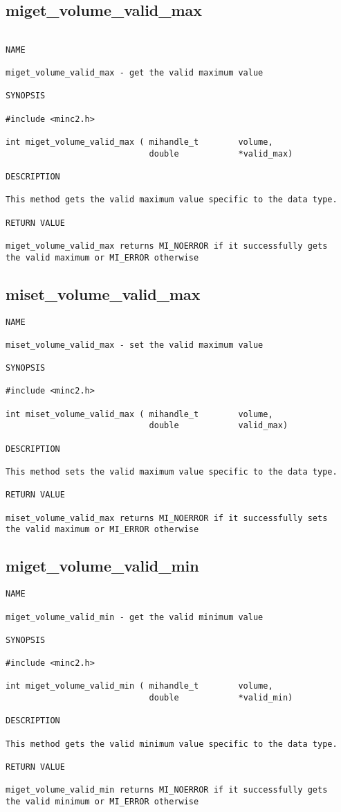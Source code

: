 \documentclass{article}
\begin{document}
\subsection{miget\_volume\_valid\_max}
\begin{verbatim}

NAME 

miget_volume_valid_max - get the valid maximum value 

SYNOPSIS

#include <minc2.h>

int miget_volume_valid_max ( mihandle_t        volume,
                             double            *valid_max)
                                
DESCRIPTION

This method gets the valid maximum value specific to the data type.

RETURN VALUE

miget_volume_valid_max returns MI_NOERROR if it successfully gets 
the valid maximum or MI_ERROR otherwise
\end{verbatim}

\subsection{miset\_volume\_valid\_max}
\begin{verbatim}
NAME 

miset_volume_valid_max - set the valid maximum value 

SYNOPSIS

#include <minc2.h>

int miset_volume_valid_max ( mihandle_t        volume,
                             double            valid_max)
                                
DESCRIPTION

This method sets the valid maximum value specific to the data type.

RETURN VALUE

miset_volume_valid_max returns MI_NOERROR if it successfully sets 
the valid maximum or MI_ERROR otherwise
\end{verbatim}

\subsection{miget\_volume\_valid\_min}
\begin{verbatim}
NAME 

miget_volume_valid_min - get the valid minimum value 

SYNOPSIS

#include <minc2.h>

int miget_volume_valid_min ( mihandle_t        volume,
                             double            *valid_min)
                                
DESCRIPTION

This method gets the valid minimum value specific to the data type.

RETURN VALUE

miget_volume_valid_min returns MI_NOERROR if it successfully gets 
the valid minimum or MI_ERROR otherwise
\end{verbatim}
\end{document}
